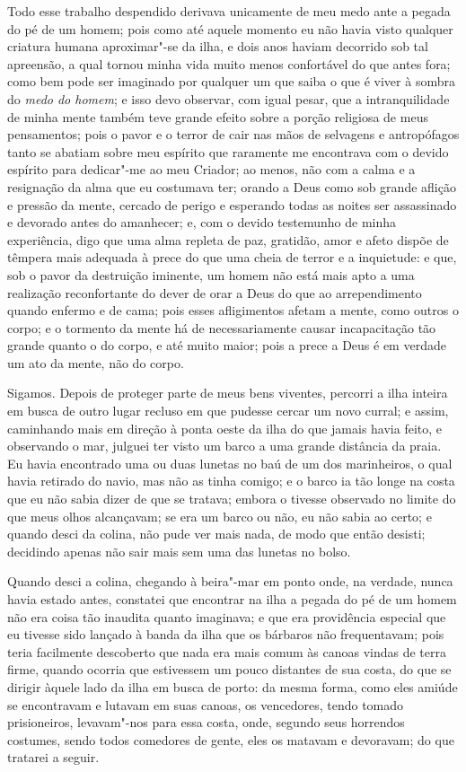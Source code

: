 Todo esse trabalho despendido derivava unicamente de meu medo ante a
pegada do pé de um homem; pois como até aquele momento eu não havia
visto qualquer criatura humana aproximar"-se da ilha, e dois anos haviam
decorrido sob tal apreensão, a qual tornou minha vida muito menos
confortável do que antes fora; como bem pode ser imaginado por qualquer
um que saiba o que é viver à sombra do \emph{medo do homem}; e isso devo
observar, com igual pesar, que a intranquilidade de minha mente também
teve grande efeito sobre a porção religiosa de meus pensamentos; pois o
pavor e o terror de cair nas mãos de selvagens e antropófagos tanto se
abatiam sobre meu espírito que raramente me encontrava com o devido
espírito para dedicar"-me ao meu Criador; ao menos, não com a calma e a
resignação da alma que eu costumava ter; orando a Deus como sob grande
aflição e pressão da mente, cercado de perigo e esperando todas as
noites ser assassinado e devorado antes do amanhecer; e, com o devido
testemunho de minha experiência, digo que uma alma repleta de paz,
gratidão, amor e afeto dispõe de têmpera mais adequada à prece do que
uma cheia de terror e a inquietude: e que, sob o pavor da destruição
iminente, um homem não está mais apto a uma realização reconfortante do
dever de orar a Deus do que ao arrependimento quando enfermo e de cama;
pois esses afligimentos afetam a mente, como outros o corpo; e o
tormento da mente há de necessariamente causar incapacitação tão grande
quanto o do corpo, e até muito maior; pois a prece a Deus é em verdade
um ato da mente, não do corpo.

Sigamos. Depois de proteger parte de meus bens viventes, percorri a ilha
inteira em busca de outro lugar recluso em que pudesse cercar um novo
curral; e assim, caminhando mais em direção à ponta oeste da ilha do que
jamais havia feito, e observando o mar, julguei ter visto um barco a uma
grande distância da praia. Eu havia encontrado uma ou duas lunetas no
baú de um dos marinheiros, o qual havia retirado do navio, mas não as
tinha comigo; e o barco ia tão longe na costa que eu não sabia dizer de
que se tratava; embora o tivesse observado no limite do que meus olhos
alcançavam; se era um barco ou não, eu não sabia ao certo; e quando
desci da colina, não pude ver mais nada, de modo que então desisti;
decidindo apenas não sair mais sem uma das lunetas no bolso.

Quando desci a colina, chegando à beira"-mar em ponto onde, na verdade,
nunca havia estado antes, constatei que encontrar na ilha a pegada do pé
de um homem não era coisa tão inaudita quanto imaginava; e que era
providência especial que eu tivesse sido lançado à banda da ilha que os
bárbaros não frequentavam; pois teria facilmente descoberto que nada era
mais comum às canoas vindas de terra firme, quando ocorria que
estivessem um pouco distantes de sua costa, do que se dirigir àquele
lado da ilha em busca de porto: da mesma forma, como eles amiúde se
encontravam e lutavam em suas canoas, os vencedores, tendo tomado
prisioneiros, levavam"-nos para essa costa, onde, segundo seus horrendos
costumes, sendo todos comedores de gente, eles os matavam e devoravam;
do que tratarei a seguir.


